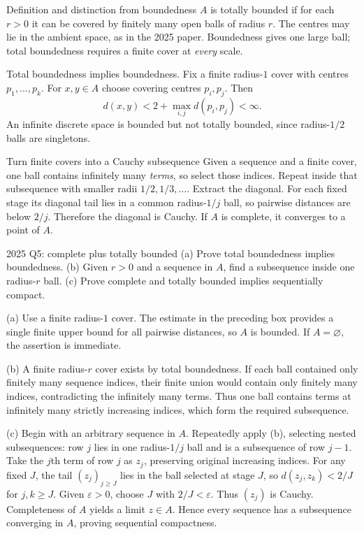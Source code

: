 \begin{note}{Definition and distinction from boundedness}
$A$ is totally bounded if for each $r>0$ it can be covered by finitely many open balls of radius $r$. The centres may lie in the ambient space, as in the 2025 paper. Boundedness gives one large ball; total boundedness requires a finite cover at \emph{every} scale.

Total boundedness implies boundedness. Fix a finite radius-$1$ cover with centres $p_1,\ldots,p_k$. For $x,y\in A$ choose covering centres $p_i,p_j$. Then
\[d(x,y)<2+\max_{i,j}d(p_i,p_j)<\infty.\]
An infinite discrete space is bounded but not totally bounded, since radius-$1/2$ balls are singletons.
\end{note}
\begin{method}{Turn finite covers into a Cauchy subsequence}
Given a sequence and a finite cover, one ball contains infinitely many \emph{terms}, so select those indices. Repeat inside that subsequence with smaller radii $1/2,1/3,\ldots$. Extract the diagonal. For each fixed stage its diagonal tail lies in a common radius-$1/j$ ball, so pairwise distances are below $2/j$. Therefore the diagonal is Cauchy. If $A$ is complete, it converges to a point of $A$.
\end{method}
\begin{exam}{2025 Q5: complete plus totally bounded}
(a) Prove total boundedness implies boundedness. (b) Given $r>0$ and a sequence in $A$, find a subsequence inside one radius-$r$ ball. (c) Prove complete and totally bounded implies sequentially compact.
\end{exam}
\begin{answer}
(a) Use a finite radius-$1$ cover. The estimate in the preceding box provides a single finite upper bound for all pairwise distances, so $A$ is bounded. If $A=\varnothing$, the assertion is immediate.

(b) A finite radius-$r$ cover exists by total boundedness. If each ball contained only finitely many sequence indices, their finite union would contain only finitely many indices, contradicting the infinitely many terms. Thus one ball contains terms at infinitely many strictly increasing indices, which form the required subsequence.

(c) Begin with an arbitrary sequence in $A$. Repeatedly apply (b), selecting nested subsequences: row $j$ lies in one radius-$1/j$ ball and is a subsequence of row $j-1$. Take the $j$th term of row $j$ as $z_j$, preserving original increasing indices. For any fixed $J$, the tail $(z_j)_{j\ge J}$ lies in the ball selected at stage $J$, so $d(z_j,z_k)<2/J$ for $j,k\ge J$. Given $\varepsilon>0$, choose $J$ with $2/J<\varepsilon$. Thus $(z_j)$ is Cauchy. Completeness of $A$ yields a limit $z\in A$. Hence every sequence has a subsequence converging in $A$, proving sequential compactness.
\end{answer}
